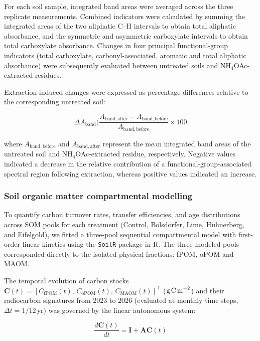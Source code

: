 \documentclass[preprint,12pt]{elsarticle}
\begin{document}
For each soil sample, integrated band areas were averaged across the three replicate measurements. Combined indicators were calculated by summing the integrated areas of the two aliphatic C--H intervals to obtain total aliphatic absorbance, and the symmetric and asymmetric carboxylate intervals to obtain total carboxylate absorbance. Changes in four principal functional-group indicators (total carboxylate, carbonyl-associated, aromatic and total aliphatic absorbance) were subsequently evaluated between untreated soils and NH$_4$OAc-extracted residues.

Extraction-induced changes were expressed as percentage differences relative to the corresponding untreated soil:

\begin{equation}
\Delta A_{\mathrm{band}} (%
\frac{
A_{\mathrm{band,after}} -
A_{\mathrm{band,before}}
}{
A_{\mathrm{band,before}}
}
\times 100
\label{eq:ftir_percentage_change}
\end{equation}

where $A_{\mathrm{band,before}}$ and $A_{\mathrm{band,after}}$ represent the mean integrated band areas of the untreated soil and NH$_4$OAc-extracted residue, respectively. Negative values indicated a decrease in the relative contribution of a functional-group-associated spectral region following extraction, whereas positive values indicated an increase. 

  
\subsubsection{Soil organic matter compartmental modelling}
To quantify carbon turnover rates, transfer efficiencies, and age distributions across SOM pools for each treatment (Control, Bolsdorfer, Lime, H\"{u}hnerberg, and Eifelgold), we fitted a three-pool sequential compartmental model with first-order linear kinetics using the \texttt{SoilR} package \citep{Sierra2012, Sierra2014} in R. The three modeled pools corresponded directly to the isolated physical fractions: fPOM, oPOM and MAOM.

The temporal evolution of carbon stocks $\mathbf{C}(t) = [C_{\text{fPOM}}(t),\, C_{\text{oPOM}}(t),\, C_{\text{MAOM}}(t)]^{\top}$ ($\text{g\,C\,m}^{-2}$) and their radiocarbon signatures from $2023$ to $2026$ (evaluated at monthly time steps, $\Delta t = 1/12\,\text{yr}$) was governed by the linear autonomous system:

\begin{equation}
\frac{d\mathbf{C}(t)}{dt} = \mathbf{I} + \mathbf{A}\mathbf{C}(t)
\end{equation}
\end{document}
